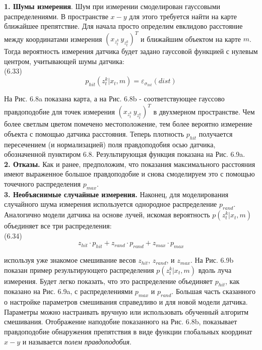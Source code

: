 \documentclass[10pt,a4paper]{article}
\begin{document}
\textbf{1. Шумы измерения}. Шум при измерении смоделирован гауссовыми распределениями. В пространстве $x-y$ для этого требуется найти на карте ближайшее препятствие. Для начала просто определим  евклидово расстояние между 
координатами измерения $(x_{z^k_t}\,y_{z^k_t})^T$ и ближайшим объектом на карте $m$. Тогда вероятность измерения датчика будет задано гауссовой функцией с нулевым центром, учитывающей шумы датчика:\\

(6.33)
$$p_{hit}(z_t^k|x_t,m)=\varepsilon_{\sigma_{hit}}(\textit{dist})$$

На Рис. 6.8a показана карта, а на Рис. 6.8b - соответствующее гауссово правдоподобие для точек измерения $(x_{z^k_t}\,y_{z^k_t})^T$ в двухмерном пространстве. Чем более светлым цветом помечено местоположение, тем более вероятно измерение объекта с помощью датчика расстояния. Теперь плотность $p_{hit}$ получается пересечением (и нормализацией) поля правдоподобия  осью датчика, обозначенной пунктиром 6.8. Результирующая функция показана на Рис. 6.9a.\\

\textbf{2. Отказы.} Как и ранее, предположим, что показания максимального расстояния имеют выраженное большое правдоподобие и снова смоделируем это с помощью точечного распределения $p_{max}$.\\

\textbf{3. Необъяснимые случайные измерения.} Наконец, для моделирования случайного шума измерения используется однородное распределение $p_{rand}$.\\

Аналогично модели датчика на основе лучей, искомая вероятность $p(z_t^k | x_t, m)$ объединяет все три распределения:\\

(6.34)
$$z_{hit}\cdot p_{hit}+z_{rand}\cdot p_{rand}+z_{max}\cdot p_{max}$$

используя уже знакомое смешивание весов $z_{hit}$, $z_{rand}$, и $z_{max}$. На Рис. 6.9b показан пример результирующего распределения $p(z_t^k | x_t, m)$ вдоль луча измерения. Будет легко показать, что это распределение объединяет $p_{hit}$, как показано на Рис. 6.9a, с распределениями $p_{max}$ и $p_{rand}$. Большая часть сказанного о настройке параметров смешивания справедливо и для новой модели датчика. Параметры можно настраивать вручную или использовать обученный алгоритм смешивания.
Отображение наподобие показанного на Рис. 6.8b, показывает правдоподобие обнаружения препятствия в виде функции глобальных координат $x-y$ и называется \textit{полем правдоподобия}.
\end{document}
